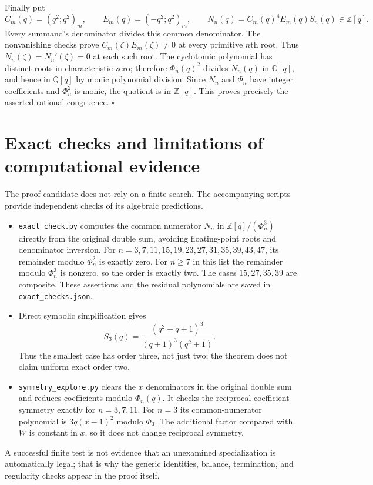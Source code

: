 \documentclass[11pt]{article}
\newcommand{\qp}[3]{(#1;#2)_{#3}}
\begin{document}
Finally put
\[
 C_m(q)=\qp{q^2}{q^2}{m},\qquad E_m(q)=\qp{-q^2}{q^2}{m},\qquad
 N_n(q)=C_m(q)^4E_m(q)S_n(q)\in\mathbb Z[q].
\]
Every summand's denominator divides this common denominator. The
nonvanishing checks prove $C_m(\zeta)E_m(\zeta)\ne0$ at every primitive
$n$th root. Thus $N_n(\zeta)=N_n'(\zeta)=0$ at each such root.
The cyclotomic polynomial has distinct roots in characteristic zero;
therefore $\Phi_n(q)^2$ divides $N_n(q)$ in $\mathbb C[q]$, and hence in
$\mathbb Q[q]$ by monic polynomial division. Since $N_n$ and $\Phi_n$ have
integer coefficients and $\Phi_n^2$ is monic, the quotient is in
$\mathbb Z[q]$. This proves precisely the asserted rational congruence.
\hfill$\square$

\section{Exact checks and limitations of computational evidence}
The proof candidate does not rely on a finite search. The accompanying
scripts provide independent checks of its algebraic predictions.
\begin{itemize}
\item \texttt{exact\_check.py} computes the common numerator $N_n$ in
$\mathbb Z[q]/(\Phi_n^3)$ directly from the original double sum, avoiding
floating-point roots and denominator inversion. For
$n=3,7,11,15,19,23,27,31,35,39,43,47$, its remainder modulo $\Phi_n^2$
is exactly zero. For $n\geq7$ in this list the remainder modulo
$\Phi_n^3$ is nonzero, so the order is exactly two. The cases $15,27,35,39$
are composite. These assertions and the residual polynomials are saved in
\texttt{exact\_checks.json}.
\item Direct symbolic simplification gives
\[
 S_3(q)=\frac{(q^2+q+1)^3}{(q+1)^3(q^2+1)}.
\]
Thus the smallest case has order three, not just two; the theorem does
not claim uniform exact order two.
\item \texttt{symmetry\_explore.py} clears the $x$ denominators in the
original double sum and reduces coefficients modulo $\Phi_n(q)$.
It checks the reciprocal coefficient symmetry exactly for $n=3,7,11$.
For $n=3$ its common-numerator polynomial is $3q(x-1)^2$ modulo $\Phi_3$.
The additional factor compared with $W$ is constant in $x$, so it does
not change reciprocal symmetry.
\end{itemize}
A successful finite test is not evidence that an unexamined specialization
is automatically legal; that is why the generic identities, balance,
termination, and regularity checks appear in the proof itself.
\end{document}
